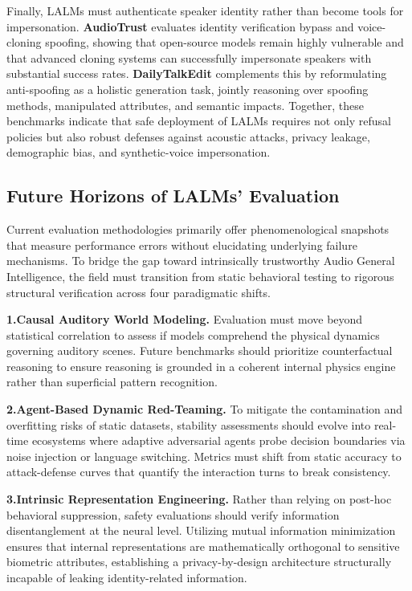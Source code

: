 \documentclass{llmxive}
\begin{document}
Finally, LALMs must authenticate speaker identity rather than become tools for impersonation. \textbf{AudioTrust} \cite{li2025audiotrust} evaluates identity verification bypass and voice-cloning spoofing, showing that open-source models remain highly vulnerable and that advanced cloning systems can successfully impersonate speakers with substantial success rates. \textbf{DailyTalkEdit} \cite{xu2026holiantispoof} complements this by reformulating anti-spoofing as a holistic generation task, jointly reasoning over spoofing methods, manipulated attributes, and semantic impacts. Together, these benchmarks indicate that safe deployment of LALMs requires not only refusal policies but also robust defenses against acoustic attacks, privacy leakage, demographic bias, and synthetic-voice impersonation.
\subsection{Future Horizons of LALMs' Evaluation} \label{sec:5.4}

Current evaluation methodologies primarily offer phenomenological snapshots that measure performance errors without elucidating underlying failure mechanisms. To bridge the gap toward intrinsically trustworthy Audio General Intelligence, the field must transition from static behavioral testing to rigorous structural verification across four paradigmatic shifts.

\textbf{1.Causal Auditory World Modeling.}  Evaluation must move beyond statistical correlation to assess if models comprehend the physical dynamics governing auditory scenes. Future benchmarks should prioritize counterfactual reasoning to ensure reasoning is grounded in a coherent internal physics engine rather than superficial pattern recognition.

\textbf{2.Agent-Based Dynamic Red-Teaming.} To mitigate the contamination and overfitting risks of static datasets, stability assessments should evolve into real-time ecosystems where adaptive adversarial agents probe decision boundaries via noise injection or language switching. Metrics must shift from static accuracy to attack-defense curves that quantify the interaction turns to break consistency.

\textbf{3.Intrinsic Representation Engineering.} Rather than relying on post-hoc behavioral suppression, safety evaluations should verify information disentanglement at the neural level. Utilizing mutual information minimization ensures that internal representations are mathematically orthogonal to sensitive biometric attributes, establishing a privacy-by-design architecture structurally incapable of leaking identity-related information.
\end{document}
